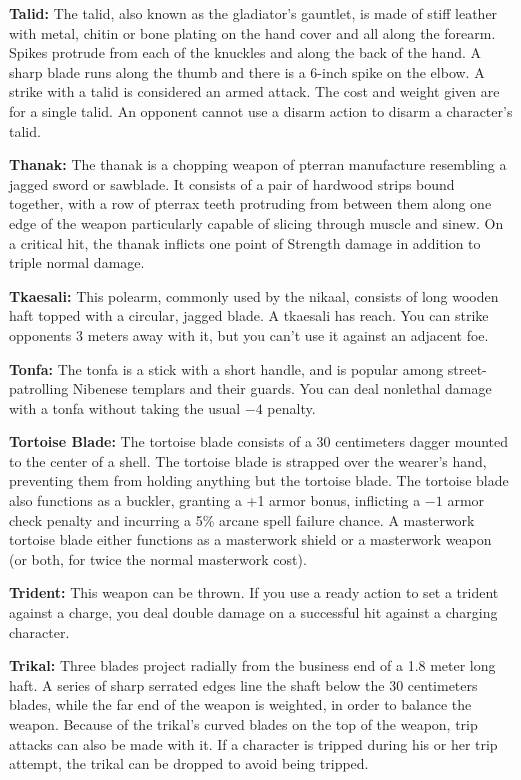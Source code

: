 \textbf{Talid:} The talid, also known as the gladiator's gauntlet, is made of stiff leather with metal, chitin or bone plating on the hand cover and all along the forearm. Spikes protrude from each of the knuckles and along the back of the hand. A sharp blade runs along the thumb and there is a 6-inch spike on the elbow. A strike with a talid is considered an armed attack. The cost and weight given are for a single talid. An opponent cannot use a disarm action to disarm a character's talid.

\textbf{Thanak:} The thanak is a chopping weapon of pterran manufacture resembling a jagged sword or sawblade. It consists of a pair of hardwood strips bound together, with a row of pterrax teeth protruding from between them along one edge of the weapon particularly capable of slicing through muscle and sinew. On a critical hit, the thanak inflicts one point of Strength damage in addition to triple normal damage.

\textbf{Tkaesali:} This polearm, commonly used by the nikaal, consists of long wooden haft topped with a circular, jagged blade. A tkaesali has reach. You can strike opponents 3 meters away with it, but you can't use it against an adjacent foe.

\textbf{Tonfa:} The tonfa is a stick with a short handle, and is popular among street-patrolling Nibenese templars and their guards. You can deal nonlethal damage with a tonfa without taking the usual $-4$ penalty.

\textbf{Tortoise Blade:} The tortoise blade consists of a 30 centimeters dagger mounted to the center of a shell. The tortoise blade is strapped over the wearer's hand, preventing them from holding anything but the tortoise blade. The tortoise blade also functions as a buckler, granting a +1 armor bonus, inflicting a $-1$ armor check penalty and incurring a 5\% arcane spell failure chance. A masterwork tortoise blade either functions as a masterwork shield or a masterwork weapon (or both, for twice the normal masterwork cost).

\textbf{Trident:} This weapon can be thrown. If you use a ready action to set a trident against a charge, you deal double damage on a successful hit against a charging character. 

\textbf{Trikal:} Three blades project radially from the business end of a 1.8 meter long haft. A series of sharp serrated edges line the shaft below the 30 centimeters blades, while the far end of the weapon is weighted, in order to balance the weapon. Because of the trikal's curved blades on the top of the weapon, trip attacks can also be made with it. If a character is tripped during his or her trip attempt, the trikal can be dropped to avoid being tripped.

